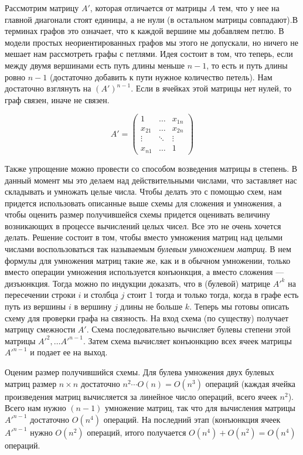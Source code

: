 \documentclass[a4paper, 12pt]{article}
\begin{document}
Рассмотрим матрицу $A'$, которая отличается от матрицы $A$ тем, что у нее на главной диагонали стоят единицы, а не нули (в остальном
матрицы совпадают).В терминах графов это означает, что к каждой вершине мы добавляем петлю. В модели простых неориентированных графов мы этого не допускали, но ничего не мешает нам рассмотреть графы с петлями. Идея состоит в том, что теперь, если между двумя вершинами есть путь длины меньше $n - 1$, то есть и путь длины ровно $n - 1$ (достаточно добавить к пути нужное количество петель). Нам достаточно взглянуть на $(A')^{n - 1}$. Если в ячейках этой матрицы нет нулей, то граф связен, иначе не связен. 

\[A' = \begin{pmatrix} 1 & \ldots & x_{1n} \\ x_{21} & \ldots & x_{2n} \\ \vdots & \ddots & \vdots \\ x_{n1} & \ldots & 1 \end{pmatrix}\]

Также упрощение можно провести со способом возведения матрицы в степень. В данный момент мы это делаем над действительными числами, что заставляет нас складывать и умножать целые числа. Чтобы делать это с помощью схем, нам придется использовать описанные выше схемы для сложения и умножения, а чтобы оценить размер получившейся схемы придется оценивать величину возникающих в процессе
вычислений целых чисел. Все это не очень хочется делать. Решение состоит в том, чтобы вместо умножения матриц над целыми числами воспользоваться так называемым \textit{булевым умножением матриц}. В нем формулы для умножения матриц такие же, как и в обычном умножении, только вместо операции умножения используется конъюнкция, а вместо сложения --- дизъюнкция. Тогда можно по индукции доказать, что в (булевой) матрице $A'^k$ на пересечении строки $i$ и столбца $j$ стоит 1 тогда и только тогда, когда в графе есть путь из вершины $i$ в вершину $j$ длины не больше $k$. Теперь мы готовы описать схему для проверки графа на связность. На вход схема
(по существу) получает матрицу смежности $A'$. Схема последовательно вычисляет булевы степени этой матрицы $A'^2, \ldots A'^{n - 1}$. Затем схема вычисляет конъюнкцию всех ячеек матрицы $A'^{n - 1}$ и подает ее на выход. 

Оценим размер получившийся схемы. Для булева умножения двух булевых матриц размер $n \times n$ достаточно $n^2 \cdots O(n) = O(n^3)$ операций (каждая ячейка произведения матриц вычисляется за линейное число операций, всего ячеек $n^2$). Всего нам нужно $(n - 1)$ умножение матриц, так что для вычисления матрицы $A'^{n - 1}$ достаточно $O(n^4)$ операций. На последний этап (конъюнкция ячеек $A'^{n - 1}$ нужно $O(n^2)$ операций, итого получается $O(n^4) + O(n^2) = O(n^4)$ операций.
\end{document}
